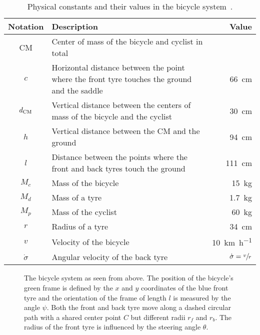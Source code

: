 \begin{table}[p]
    \centering
    \caption{Physical constants and their values in the bicycle system~\cite{randlov_learning_1998}.}
    \label{tab:bicycle_constants}
    \begin{tabularx}{\tablewidth}{cXr}
        \toprule
        Notation & Description & Value \\
        \midrule
        CM & Center of mass of the bicycle and cyclist in total & \\
        $c$ & Horizontal distance between the point where the front tyre touches the ground and the saddle & \SI{66}{\cm} \\
        $d_{\text{CM}}$ & Vertical distance between the centers of mass of the bicycle and the cyclist & \SI{30}{\cm} \\
        $h$ & Vertical distance between the CM and the ground & \SI{94}{\cm} \\
        $l$ & Distance between the points where the front and back tyres touch the ground & \SI{111}{\cm} \\
        $M_c$ & Mass of the bicycle & \SI{15}{\kg} \\
        $M_d$ & Mass of a tyre & \SI{1.7}{\kg} \\
        $M_p$ & Mass of the cyclist & \SI{60}{\kg} \\
        $r$ & Radius of a tyre & \SI{34}{\cm} \\
        $v$ & Velocity of the bicycle & \SI{10}{\km\per\hour} \\
        $\dot{\sigma}$ & Angular velocity of the back tyre & $\dot{\sigma} = \sfrac{v}{r}$ \\
        \bottomrule
    \end{tabularx}
\end{table}
\begin{figure}[p]
    \centering
    
    \caption[The bicycle system as seen from above]{
        The bicycle system as seen from above.
        The position of the bicycle's green frame is defined by the $x$ and $y$ coordinates of the blue front tyre and the orientation of the frame of length $l$ is measured by the angle $\psi$.
        Both the front and back tyre move along a dashed circular path with a shared center point $C$ but different radii $r_f$ and $r_b$.
        The radius of the front tyre is influenced by the steering angle $\theta$.
    }
    \label{fig:bicycle:above}
\end{figure}
